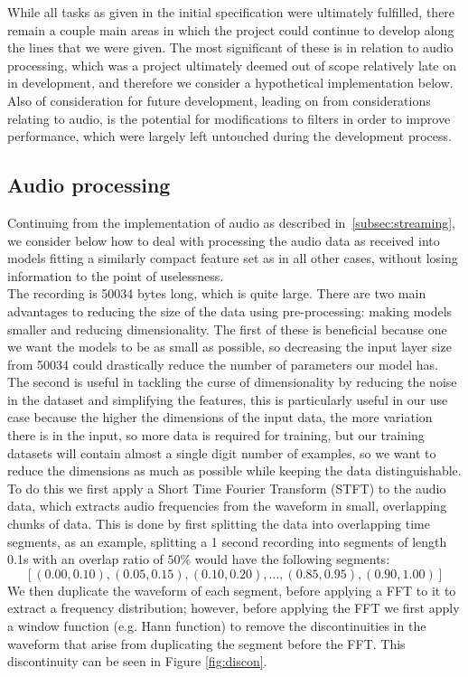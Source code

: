 \documentclass{article}
\begin{document}
While all tasks as given in the initial specification were ultimately fulfilled, there remain a couple main areas in which the project could continue to develop along the lines that we were given. The most significant of these is in relation to audio processing, which was a project ultimately deemed out of scope relatively late on in development, and therefore we consider a hypothetical implementation below. Also of consideration for future development, leading on from considerations relating to audio, is the potential for modifications to filters in order to improve performance, which were largely left untouched during the development process.

\subsection{Audio processing}%
\label{subsec:audio}

Continuing from the implementation of audio as described in~\ref{subsec:streaming}, we consider below how to deal with processing the audio data as received into models fitting a similarly compact feature set as in all other cases, without losing information to the point of uselessness. \\

The recording is 50034 bytes long, which is quite large. There are two main advantages to reducing the size of the data using pre-processing: making models smaller and reducing dimensionality. The first of these is beneficial because one we want the models to be as small as possible, so decreasing the input layer size from 50034 could drastically reduce the number of parameters our model has. The second is useful in tackling the curse of dimensionality by reducing the noise in the dataset and simplifying the features, this is particularly useful in our use case because the higher the dimensions of the input data, the more variation there is in the input, so more data is required for training, but our training datasets will contain almost a single digit number of examples, so we want to reduce the dimensions as much as possible while keeping the data distinguishable. \\

To do this we first apply a Short Time Fourier Transform (STFT) to the audio data, which extracts audio frequencies from the waveform in small, overlapping chunks of data. This is done by first splitting the data into overlapping time segments, as an example, splitting a 1 second recording into segments of length 0.1s with an overlap ratio of $50\%$ would have the following segments:
\[
  [(0.00,0.10), (0.05,0.15), (0.10,0.20), \ldots, (0.85,0.95), (0.90,1.00)]
\]
We then duplicate the waveform of each segment, before applying a FFT to it to extract a frequency distribution; however, before applying the FFT we first apply a window function (e.g. Hann function) to remove the discontinuities in the waveform that arise from duplicating the segment before the FFT. This discontinuity can be seen in Figure \ref{fig:discon}. \\
\end{document}
